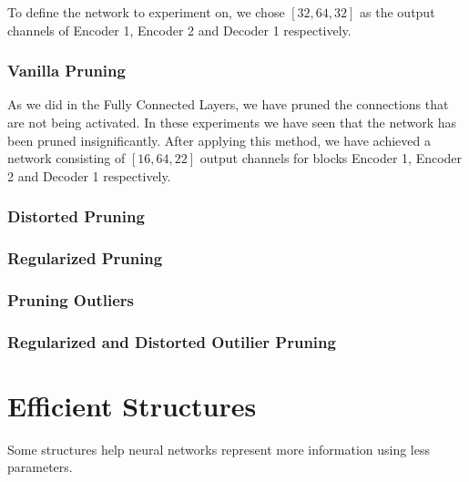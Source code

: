 To define the network to experiment on, we chose $[32, 64, 32]$ as the output channels of Encoder 1, Encoder 2 and Decoder 1 respectively.


\subsubsection{Vanilla Pruning}
As we did in the Fully Connected Layers, we have pruned the connections that are not being activated. In these experiments we have seen that the network has been pruned insignificantly. After applying this method, we have achieved a network consisting of $[16, 64, 22]$ output channels for blocks Encoder 1, Encoder 2 and Decoder 1 respectively.

\subsubsection{Distorted Pruning}

\subsubsection{Regularized Pruning}

\subsubsection{Pruning Outliers}

\subsubsection{Regularized and Distorted Outilier Pruning}


\section{Efficient Structures}
Some structures help neural networks represent more information using less parameters.
